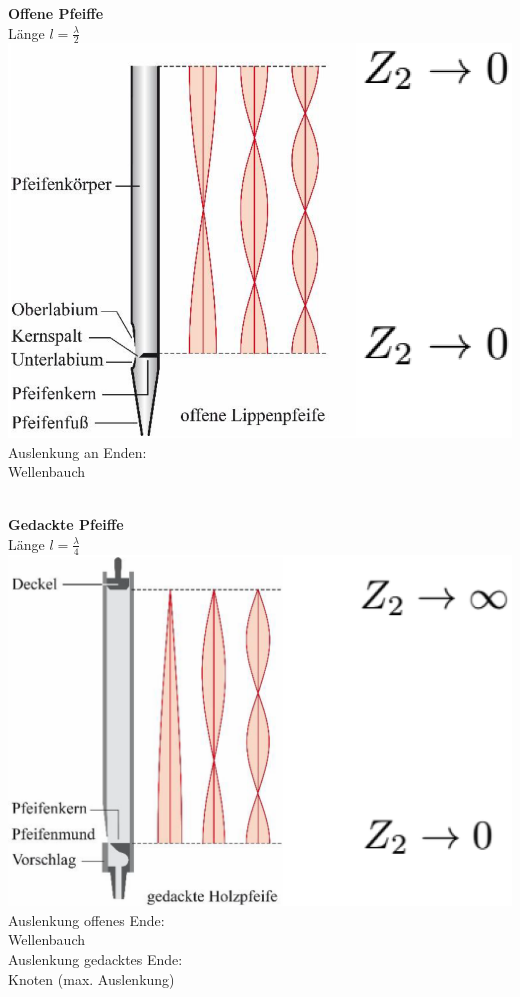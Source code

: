 \begin{minipage}{0.48\linewidth}
\textbf{Offene Pfeiffe}\\
Länge $l = \frac{\lambda}{2}$ \\

\includegraphics[width=0.85\linewidth]{Bilder/Wellen-Optik/offene_pfeiffe}\\

Auslenkung an Enden: \\
Wellenbauch \\
\\
\end{minipage}
\hfill
\begin{minipage}{0.48\linewidth}
\textbf{Gedackte Pfeiffe} \\
Länge $l = \frac{\lambda}{4}$ \\

\includegraphics[width=0.9\linewidth]{Bilder/Wellen-Optik/gedackte_pfeiffe} \\

Auslenkung offenes Ende: \\
Wellenbauch \\
Auslenkung gedacktes Ende:\\
Knoten  (max. Auslenkung)
\end{minipage}


